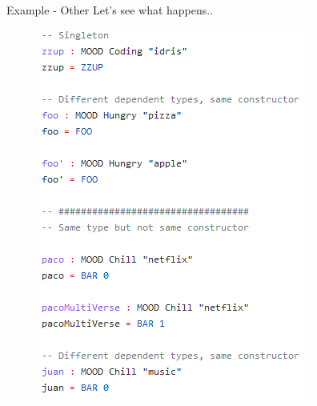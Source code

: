 \documentclass{beamer}
\newcommand{\othertitle}{Example - Other}
\begin{document}
\begin{frame}[fragile]{\othertitle}
Let's see what happens..
\begin{figure}
  \includegraphics[scale=0.56]{pics/random-code-2}
\end{figure}
\end{frame}
\end{document}
